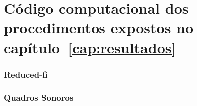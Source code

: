 \chapter{Código computacional dos procedimentos expostos no capítulo~\ref{cap:resultados}}
\label{cap:codigoPecas}

\subsection{Reduced-fi}

\subsection{Quadros Sonoros}

